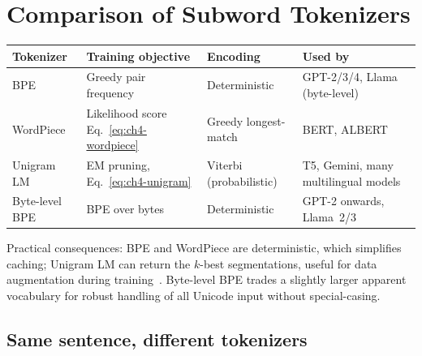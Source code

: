 \section{Comparison of Subword Tokenizers}

\begin{center}
\begin{tabular}{|p{2.5cm}|p{3.4cm}|p{3.0cm}|p{3.8cm}|}
\hline
Tokenizer & Training objective & Encoding & Used by \\
\hline
BPE              & Greedy pair frequency            & Deterministic
                   & GPT-2/3/4, Llama (byte-level) \\
WordPiece        & Likelihood score Eq.~\eqref{eq:ch4-wordpiece}  & Greedy longest-match
                   & BERT, ALBERT \\
Unigram LM       & EM pruning, Eq.~\eqref{eq:ch4-unigram}         & Viterbi (probabilistic)
                   & T5, Gemini, many multilingual models \\
Byte-level BPE   & BPE over bytes                   & Deterministic
                   & GPT-2 onwards, Llama~2/3 \\
\hline
\end{tabular}
\end{center}

Practical consequences: BPE and WordPiece are deterministic, which
simplifies caching; Unigram LM can return the $k$-best segmentations,
useful for data augmentation during training~\citep{kudo2018unigram}.
Byte-level BPE trades a slightly larger apparent vocabulary for robust
handling of all Unicode input without special-casing.

\subsection{Same sentence, different tokenizers}

